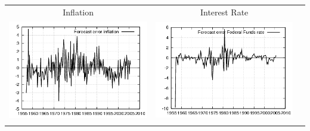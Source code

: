 \documentclass{beamer}
\begin{document}
{\begin{center}
\begin{tabular}{ccc}
  \small{Inflation} & \small{Interest Rate} & \\
  \includegraphics[scale=0.23]{plots2/cap_re_Forecast_error_inflation.png} & \includegraphics[scale=0.23]{plots2/cap_re_Forecast_error_Federal_Funds_rate.png} & \\ \\
  \end{tabular}
  \end{center}
}
\end{document}
